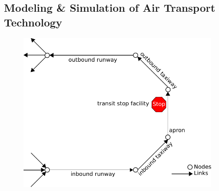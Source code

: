 \subsection{Modeling \& Simulation of Air Transport Technology}
\label{sec:modeling-of-technology}
%
\begin{figure}[t]
	\begin{minipage}{0.5\linewidth}
				\centering
			\includegraphics[width=0.9\textwidth]{extending/figures/air/sf_flight_model_airport.pdf}
		\vspace{1.3cm}


\end{minipage}
\end{figure}
